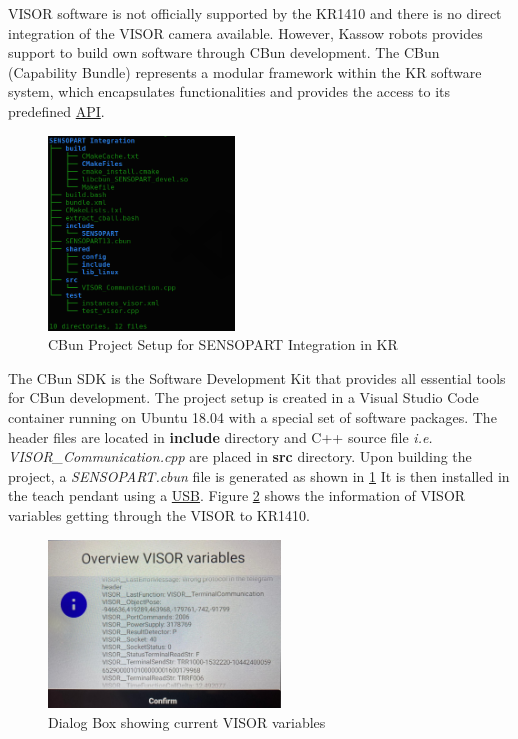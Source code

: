 VISOR software is not officially supported by the KR1410 and there is no direct integration of the VISOR camera available.
However, Kassow robots provides support to build own software through CBun development.
The CBun (Capability Bundle) represents a modular framework within the KR software system,
which encapsulates functionalities and provides the
access to its predefined \hyperref[acro:API]{API}. 


\begin{figure}[h]
    \centering
    \includegraphics[width=0.44\textwidth]{figures/sensopart-development.png}
    \caption{CBun Project Setup for SENSOPART Integration in KR}
    \label{fig:sensopart-development}
\end{figure}


The CBun SDK is the Software Development Kit that provides all essential tools
for CBun development. The project setup is created in a Visual Studio Code container
running on Ubuntu 18.04 with a special set of software packages. \cite{Cbun}
The header files are located in \textbf{include} directory and C++ source file \textit{i.e.}     \textit{VISOR\_Communication.cpp}
are placed in \textbf{src} directory.
Upon building the project, a \textit{SENSOPART.cbun} file is generated as shown in \ref{fig:sensopart-development}
It is then installed in the teach pendant using a \hyperref[acro:USB]{USB}. Figure \ref{fig:cbun-variables}
shows the information of VISOR variables getting through the VISOR to KR1410.

\begin{figure}[h]
    \centering
    \includegraphics[width=0.55\textwidth]{figures/visor-cbun-connection.png}
    \caption{Dialog Box showing current VISOR variables}
    \label{fig:cbun-variables}
\end{figure}

